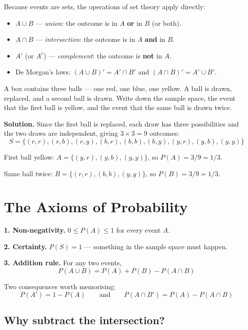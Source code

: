 \documentclass[a4paper,11pt]{article}
\begin{document}
Because events are sets, the operations of set theory apply directly:

\begin{itemize}[leftmargin=1.4em, itemsep=2pt]
\item $A \cup B$ --- \emph{union}: the outcome is in $A$ \textbf{or} in $B$ (or both).
\item $A \cap B$ --- \emph{intersection}: the outcome is in $A$ \textbf{and} in $B$.
\item $A'$ (or $A^c$) --- \emph{complement}: the outcome is \textbf{not} in $A$.
\item De Morgan's laws: $(A \cup B)' = A' \cap B'$ and $(A \cap B)' = A' \cup B'$.
\end{itemize}

\begin{example}
A box contains three balls --- one red, one blue, one yellow. A ball is drawn,
replaced, and a second ball is drawn. Write down the sample space, the event
that the first ball is yellow, and the event that the same ball is drawn twice.

\medskip
\textbf{Solution.} Since the first ball is replaced, each draw has three
possibilities and the two draws are independent, giving $3 \times 3 = 9$
outcomes:
\[ S = \{(r,r), (r,b), (r,y), (b,r), (b,b), (b,y), (y,r), (y,b), (y,y)\} \]

First ball yellow: $A = \{(y,r), (y,b), (y,y)\}$, so $P(A) = 3/9 = 1/3$.

Same ball twice: $B = \{(r,r), (b,b), (y,y)\}$, so $P(B) = 3/9 = 1/3$.
\end{example}

\section{The Axioms of Probability}

\begin{keybox}
\textbf{1. Non-negativity.} $0 \le P(A) \le 1$ for every event $A$.

\textbf{2. Certainty.} $P(S) = 1$ --- something in the sample space must happen.

\textbf{3. Addition rule.} For any two events,
\[ P(A \cup B) = P(A) + P(B) - P(A \cap B) \]

Two consequences worth memorising:
\[ P(A') = 1 - P(A) \qquad\text{and}\qquad P(A \cap B') = P(A) - P(A \cap B) \]
\end{keybox}

\subsection*{Why subtract the intersection?}
\end{document}
